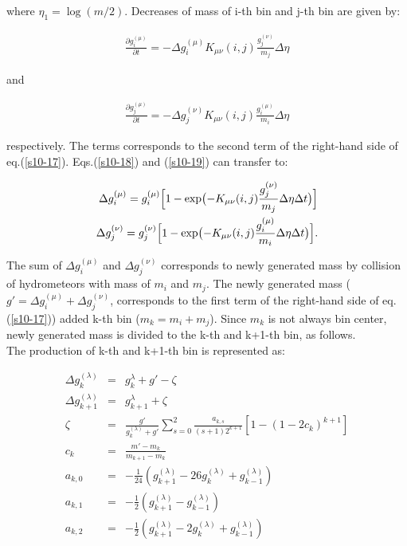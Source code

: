  where $\eta_{1}=\log(m/2)$. Decreases of mass of i-th bin and j-th bin are given by:

\begin{eqnarray}
\frac{\partial g_{i}^{(\mu)}}{\partial t}=-\Delta g^{(\mu)}_{i} K_{\mu\nu}(i,j)\frac{g_{j}^{(\nu)}}{m_{j}}\Delta \eta\label{s10-18}
\end{eqnarray}

and


\begin{eqnarray}
\frac{\partial g_{j}^{(\mu)}}{\partial t}=-\Delta g^{(\nu)}_{j}K_{\mu\nu}(i,j)\frac{g_{i}^{(\mu)}}{m_{i}}\Delta \eta\label{s10-19}
\end{eqnarray}

respectively. The terms corresponds to the second term of the right-hand side of eq.(\ref{s10-17}). Eqs.(\ref{s10-18}) and (\ref{s10-19}) can transfer to:

\begin{eqnarray}
\Delta g_{i}^{(\mu)}=g_{i}^{(\mu)}\Bigl [1-\exp\bigl(-K_{\mu\nu}(i,j)\frac{g^{(\nu)}_{j}}{m_{j}}\Delta \eta\Delta t\bigr) \Bigl]\label{s10-20}\\
\Delta g_{j}^{(\nu)}=g_{j}^{(\nu)}\Bigl [1-\exp\bigl(-K_{\mu\nu}(i,j)\frac{g^{(\mu)}_{i}}{m_{i}}\Delta \eta\Delta t\bigr) \Bigl].\label{s10-21}
\end{eqnarray}

The sum of $\Delta g_{i}^{(\mu)}$ and $\Delta g_{j}^{(\nu)}$ corresponds to newly generated mass by collision of hydrometeors with mass of $m_{i}$ and $m_{j}$. The newly generated mass ($g'=\Delta g_{i}^{(\mu)}+\Delta g_{j}^{(\nu)}$,  corresponds to the first term of the right-hand side of eq.(\ref{s10-17})) added k-th bin ($m_{k}=m_{i}+m_{j}$). Since $m_{k}$ is not always bin center, newly generated mass is divided to the k-th and k+1-th bin, as follows.\\
The production of k-th and k+1-th bin is represented as:

\begin{eqnarray}
\Delta g_{k}^{(\lambda)}&=&g_{k}^{\lambda}+g'-\zeta\label{s10-22}\\
\Delta g_{k+1}^{(\lambda)}&=&g_{k+1}^{\lambda}+\zeta\label{s10-23}\\
\zeta&=&\frac{g'}{g_{k}^{(\lambda)}+g'}\sum_{s=0}^{2}\frac{a_{k,s}}{(s+1)2^{k+1}}[1-(1-2c_{k})^{k+1}]\nonumber\\
c_{k}&=&\frac{m'-m_{k}}{m_{k+1}-m_{k}}\nonumber\\
a_{k,0}&=&-\frac{1}{24}(g_{k+1}^{(\lambda)}-26g_{k}^{(\lambda)}+g_{k-1}^{(\lambda)})\nonumber\\
a_{k,1}&=&-\frac{1}{2}(g_{k+1}^{(\lambda)}-g_{k-1}^{(\lambda)})\nonumber\\
a_{k,2}&=&-\frac{1}{2}(g_{k+1}^{(\lambda)}-2g_{k}^{(\lambda)}+g_{k-1}^{(\lambda)})\nonumber
\end{eqnarray}

